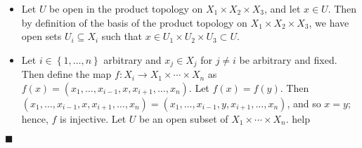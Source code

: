 \documentclass[12pt]{article}
\renewcommand{\qed}{\hfill$\blacksquare$}
\renewenvironment{proof}{\begin{addmargin}[1em]{0em}\begin{newproof}}{\end{newproof}\end{addmargin}\qed}
\begin{document}
\begin{proof}
\begin{itemize}
	\item Let $U$ be open in the product topology on $X_1 \times X_2 \times X_3$, and let $x\in U$. Then by definition of the basis of the product topology on $X_1 \times X_2 \times X_3$, we have open sets $U_i \subseteq X_i$ such that $x \in U_1 \times  U_2 \times  U_3 \subset U$.

	\item Let $i \in \left\{1,\ldots,n\right\}$ arbitrary and $x_j \in X_j$ for $j \neq i$ be arbitrary and fixed. Then define the map $f:X_i \rightarrow X_1 \times \cdots \times X_n$ as $f\left(x\right) = \left(x_1,\ldots,x_{i-1},x,x_{i+1},\ldots,x_n\right)$. Let $f\left(x\right) = f\left(y\right)$. Then $\left(x_1,\ldots,x_{i-1},x,x_{i+1},\ldots,x_n\right)=\left(x_1,\ldots,x_{i-1},y,x_{i+1},\ldots,x_n\right)$, and so $x=y$; hence, $f$ is injective. Let $U$ be an open subset of $X_1 \times \cdots \times X_n$. {\color{red} help}


\end{itemize}
\end{proof}
\end{document}
